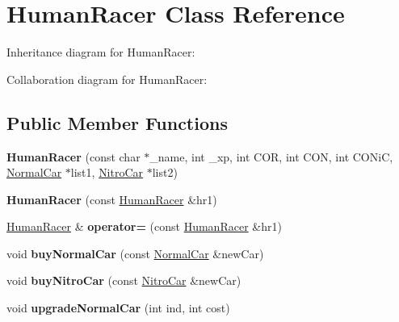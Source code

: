 \hypertarget{classHumanRacer}{}\section{Human\+Racer Class Reference}
\label{classHumanRacer}


Inheritance diagram for Human\+Racer\+:


Collaboration diagram for Human\+Racer\+:
\subsection*{Public Member Functions}
\begin{DoxyCompactItemize}
\item 
{\bfseries Human\+Racer} (const char $\ast$\+\_\+name, int \+\_\+xp, int C\+OR, int C\+ON, int C\+O\+NiC, \hyperlink{classNormalCar}{Normal\+Car} $\ast$list1, \hyperlink{classNitroCar}{Nitro\+Car} $\ast$list2)\hypertarget{classHumanRacer_a7379d2a63616e43dce22ef66e816ae20}{}\label{classHumanRacer_a7379d2a63616e43dce22ef66e816ae20}

\item 
{\bfseries Human\+Racer} (const \hyperlink{classHumanRacer}{Human\+Racer} \&hr1)\hypertarget{classHumanRacer_a612579c986030cd9976eb9c7aa08c89f}{}\label{classHumanRacer_a612579c986030cd9976eb9c7aa08c89f}

\item 
\hyperlink{classHumanRacer}{Human\+Racer} \& {\bfseries operator=} (const \hyperlink{classHumanRacer}{Human\+Racer} \&hr1)\hypertarget{classHumanRacer_a73c59c0cfc95298e0930139b84d76551}{}\label{classHumanRacer_a73c59c0cfc95298e0930139b84d76551}

\item 
void {\bfseries buy\+Normal\+Car} (const \hyperlink{classNormalCar}{Normal\+Car} \&new\+Car)\hypertarget{classHumanRacer_afbe7c7e2e5e4caa0edef3e6062cd353f}{}\label{classHumanRacer_afbe7c7e2e5e4caa0edef3e6062cd353f}

\item 
void {\bfseries buy\+Nitro\+Car} (const \hyperlink{classNitroCar}{Nitro\+Car} \&new\+Car)\hypertarget{classHumanRacer_a30c3d857684af3ae868d3eac2c08030c}{}\label{classHumanRacer_a30c3d857684af3ae868d3eac2c08030c}

\item 
void {\bfseries upgrade\+Normal\+Car} (int ind, int cost)\hypertarget{classHumanRacer_a042714837fb353896185262fee9f27bc}{}\label{classHumanRacer_a042714837fb353896185262fee9f27bc}


\end{DoxyCompactItemize}

